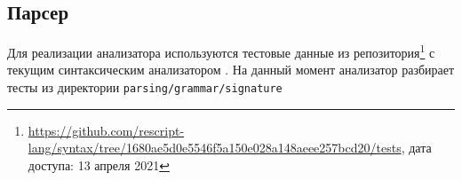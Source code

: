 \subsection{Парсер \rescript}

Для реализации анализатора используются тестовые данные из
репозитория\footnote{\url{https://github.com/rescript-lang/syntax/tree/1680ae5d0e5546f5a150e028a148aeee257bcd20/tests}, дата доступа: 13 апреля 2021}
с текущим синтаксическим анализатором \rescript.
На данный момент анализатор разбирает тесты из директории \verb|parsing/grammar/signature|
